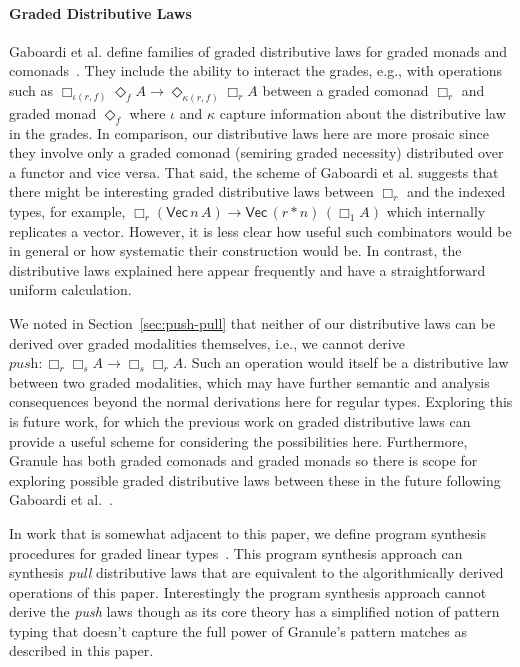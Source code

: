 \paragraph{Graded Distributive Laws}
Gaboardi et al. define families of graded distributive laws
for graded monads and comonads~\cite{combining2016}. They
include the ability to interact the grades, e.g., with operations
such as $\Box_{\iota(r,f)} \Diamond_f A \rightarrow \Diamond_{\kappa(r,f)} \Box_r A$
between a graded comonad $\Box_r$ and graded monad $\Diamond_f$ where
$\iota$ and $\kappa$ capture information about the distributive law
in the grades. In comparison, our distributive laws here are more
prosaic since they involve only a graded comonad (semiring graded
necessity) distributed over a functor and vice versa. That said,
the scheme of Gaboardi et al. suggests that there might be interesting
graded distributive laws between $\Box_r$ and the indexed types,
for example, $\Box_r (\mathsf{Vec}\, n \, A) \rightarrow \mathsf{Vec}\,
  (r * n) \, (\Box_1 A)$ which internally replicates a
  vector. However, it is less clear how useful such combinators would
be in general or how systematic their construction would be. In
contrast, the distributive laws explained here appear frequently
and have a straightforward uniform calculation.

We noted in Section~\ref{sec:push-pull} that neither of our
distributive laws can be derived over graded modalities themselves,
i.e., we cannot derive
$\textit{push} : \Box_r \Box_s A \rightarrow \Box_s \Box_r A$. Such an
operation would itself be a distributive law between two graded modalities,
which may have further semantic and analysis consequences beyond the normal derivations here
for regular types. Exploring this is future work, for which the previous
work on graded distributive laws can provide a useful
scheme for considering the possibilities here.
Furthermore, Granule has both graded comonads and graded monads
so there is scope for exploring possible graded distributive laws
between these in the future following Gaboardi et
al.~\cite{combining2016}.

In work that is somewhat adjacent to this paper, we define program
synthesis procedures for graded linear
types~\cite{DBLP:conf/lopstr/HughesO20}. This program synthesis
approach can synthesis \emph{pull} distributive laws that are
equivalent to the algorithmically derived operations of this
paper. Interestingly the program synthesis approach cannot derive the
\emph{push} laws though as its core theory has a simplified notion of
pattern typing that doesn't capture the full power of Granule's
pattern matches as described in this paper.

